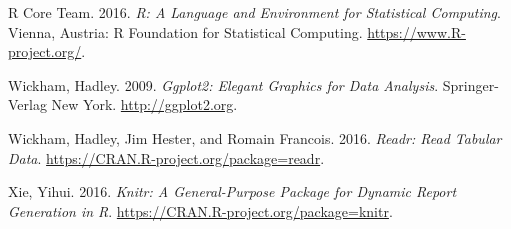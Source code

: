 \documentclass[]{article}
\theoremstyle{definition}
\theoremstyle{definition}
\theoremstyle{definition}
\theoremstyle{remark}
\begin{document}
\hypertarget{ref-baseR}{}
R Core Team. 2016. \emph{R: A Language and Environment for Statistical
Computing}. Vienna, Austria: R Foundation for Statistical Computing.
\url{https://www.R-project.org/}.

\hypertarget{ref-ggplot2}{}
Wickham, Hadley. 2009. \emph{Ggplot2: Elegant Graphics for Data
Analysis}. Springer-Verlag New York. \url{http://ggplot2.org}.

\hypertarget{ref-readr}{}
Wickham, Hadley, Jim Hester, and Romain Francois. 2016. \emph{Readr:
Read Tabular Data}. \url{https://CRAN.R-project.org/package=readr}.

\hypertarget{ref-knitr}{}
Xie, Yihui. 2016. \emph{Knitr: A General-Purpose Package for Dynamic
Report Generation in R}. \url{https://CRAN.R-project.org/package=knitr}.
\end{document}
